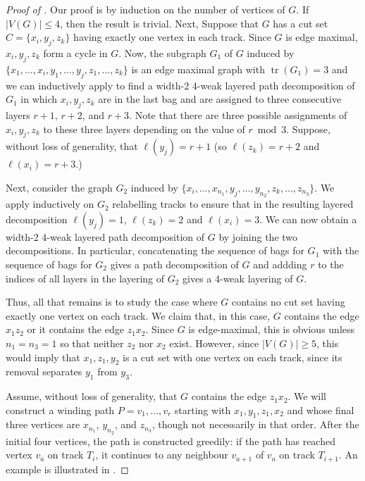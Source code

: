 \documentclass{patmorin}
\DeclareMathOperator{\tr}{tr}
\begin{document}
\begin{proof}[Proof of ]
  Our proof is by induction on the number of vertices of $G$.  If
  $|V(G)|\le 4$, then the result is trivial.  Next, Suppose that $G$ has
  a cut set $C=\{x_i,y_j,z_k\}$ having exactly one vertex in each track.
  Since $G$ is edge maximal, $x_i,y_j,z_k$ form a cycle in $G$.  Now,
  the subgraph $G_1$ of $G$ induced by $\{x_1,\ldots,x_i, y_1,\ldots,y_j,
  z_1,\ldots,z_k\}$ is an edge maximal graph with $\tr(G_1)=3$ and we
  can inductively apply  to find a width-2 4-weak layered
  path decomposition of $G_1$ in which $x_i,y_j,z_k$ are in the last bag
  and are assigned to three consecutive layers $r+1$, $r+2$, and $r+3$.
  Note that there are three possible assignments of $x_i,y_j,z_k$ to
  these three layers depending on the value of $r\bmod 3$.  Suppose,
  without loss of generality, that $\ell(y_j)=r+1$ (so $\ell(z_k)=r+2$
  and $\ell(x_i)=r+3$.)

  Next, consider the graph $G_2$ induced by
  $\{x_i,\ldots,x_{n_1},y_j,\ldots,y_{n_2},z_k,\ldots,z_{n_3}\}$.
  We apply  inductively on $G_2$ relabelling tracks to
  ensure that in the resulting layered decomposition $\ell(y_j)=1$,
  $\ell(z_k)=2$ and $\ell(x_i)=3$.   We can now obtain a width-2 4-weak
  layered path decomposition of $G$ by joining the two decompositions.
  In particular,  concatenating the sequence of bags for $G_1$ with
  the sequence of bags for $G_2$ gives a path decomposition of $G$
  and addding $r$ to the indices of all layers in the layering of $G_2$
  gives a 4-weak layering of $G$.

  Thus, all that remains is to study the case where $G$ contains no cut
  set having exactly one vertex on each track.  We claim that, in this
  case, $G$ contains the edge $x_1z_2$ or it contains the edge $z_1x_2$.
  Since $G$ is edge-maximal, this is obvious unless $n_1=n_3=1$ so
  that neither $z_2$ nor $x_2$ exist.  However, since $|V(G)|\ge 5$,
  this would imply that $x_1,z_1,y_2$ is a cut set with one vertex on
  each track, since its removal separates $y_1$ from $y_3$.

  Assume, without loss of generality, that $G$ contains the edge $z_1x_2$.
  We will construct a winding path $P=v_1,\ldots,v_r$ starting with
  $x_1,y_1,z_1,x_2$ and whose final three vertices are $x_{n_1}$,
  $y_{n_2}$, and $z_{n_3}$, though not necessarily in that order.
  After the initial four vertices, the path is constructed greedily:
  if the path has reached vertex $v_a$ on track $T_i$, it continues to
  any neighbour $v_{a+1}$ of $v_a$ on track $T_{i+1}$.  An example is
  illustrated in .


\end{proof}
\end{document}
